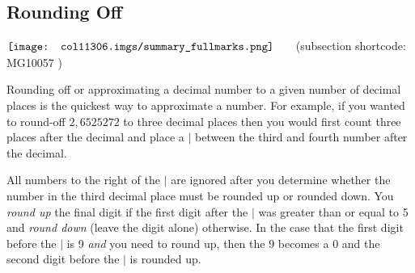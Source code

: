    \subsection{ Rounding Off}
            \nopagebreak
            \label{m38349*cid4} $ \hspace{-5pt}\begin{array}{cccccccccccc}   \texttt{[image: col11306.imgs/summary\_fullmarks.png]} &   \end{array} $ \hspace{2 pt}\raisebox{-5 pt}{} {(subsection shortcode: MG10057 )} \par 
      \label{m38349*id324198}Rounding off or approximating a decimal number to a given number of decimal places is the quickest way to approximate a number. For example, if you wanted to round-off $2,6525272$ to three decimal places then you would first count three places after the decimal and place a $|$ between the third and fourth number after the decimal.\par 
      \label{m38349*id325085}\nopagebreak\noindent{}
      \label{m38349*id325105}All numbers to the right of the $|$ are ignored after you determine whether the number in the third decimal place must be rounded up or rounded down. You \textsl{round up} the final digit if the first digit after the $|$ was greater than or equal to 5 and \textsl{round down} (leave the digit alone) otherwise. In the case that the first digit before the $|$ is 9 \textsl{and} you need to round up, then the 9 becomes a 0 and the second digit before the $|$ is rounded up.\par 
